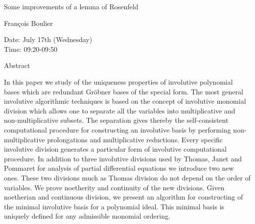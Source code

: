 \begin{center}
\LARGE
Some improvements of a lemma of Rosenfeld

\end{center}

\begin{center}
\Large
Fran\c{c}ois Boulier
\end{center}

\noindent
Date:  July 17th (Wednesday)\\
Time:  09:20-09:50\\

\begin{center}
\large
Abstract
\end{center}

In this paper we study of the uniqueness properties of involutive polynomial bases which are
redundant Gr\"obner bases of the special form. The most general involutive algorithmic techniques
is based on the concept of involutive monomial division which allows one to separate all the
variables into multiplicative and non-multiplicative subsets. The separation gives thereby the
self-consistent computational procedure for constructing an involutive basis by performing
non-multiplicative prolongations and multiplicative reductions. Every specific involutive division
generates a particular form of involutive computational procedure. In addition to three involutive
divisions used by Thomas, Janet and Pommaret for analysis of partial differential equations we
introduce two new ones. These two divisions much as Thomas division do not depend on the order
of variables. We prove noetherity and continuity of the new divisions. Given noetherian and
continuous division, we present an algorithm for constructing of the minimal involutive basis for a
polynomial ideal. This minimal basis is uniquely defined for any admissible monomial ordering. 

